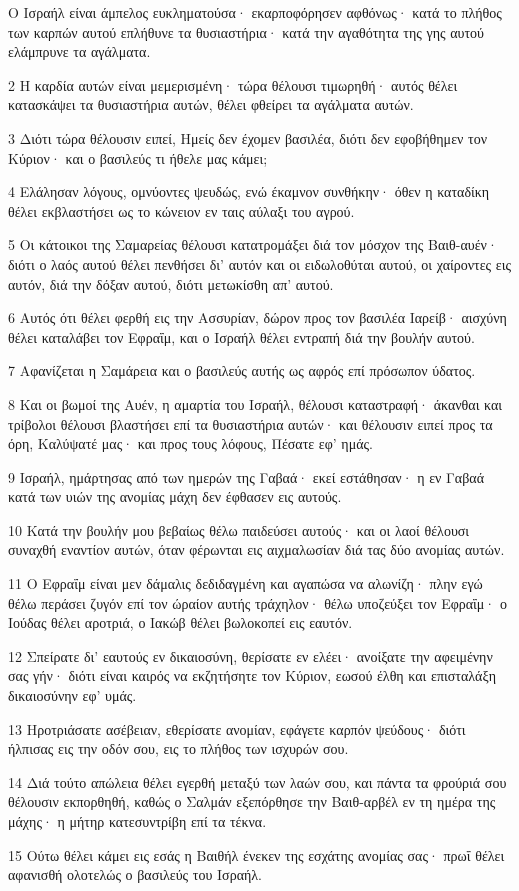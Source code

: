 \par Ο Ισραήλ είναι άμπελος ευκληματούσα· εκαρποφόρησεν αφθόνως· κατά το πλήθος των καρπών αυτού επλήθυνε τα θυσιαστήρια· κατά την αγαθότητα της γης αυτού ελάμπρυνε τα αγάλματα.
\par 2 Η καρδία αυτών είναι μεμερισμένη· τώρα θέλουσι τιμωρηθή· αυτός θέλει κατασκάψει τα θυσιαστήρια αυτών, θέλει φθείρει τα αγάλματα αυτών.
\par 3 Διότι τώρα θέλουσιν ειπεί, Ημείς δεν έχομεν βασιλέα, διότι δεν εφοβήθημεν τον Κύριον· και ο βασιλεύς τι ήθελε μας κάμει;
\par 4 Ελάλησαν λόγους, ομνύοντες ψευδώς, ενώ έκαμνον συνθήκην· όθεν η καταδίκη θέλει εκβλαστήσει ως το κώνειον εν ταις αύλαξι του αγρού.
\par 5 Οι κάτοικοι της Σαμαρείας θέλουσι κατατρομάξει διά τον μόσχον της Βαιθ-αυέν· διότι ο λαός αυτού θέλει πενθήσει δι' αυτόν και οι ειδωλοθύται αυτού, οι χαίροντες εις αυτόν, διά την δόξαν αυτού, διότι μετωκίσθη απ' αυτού.
\par 6 Αυτός ότι θέλει φερθή εις την Ασσυρίαν, δώρον προς τον βασιλέα Ιαρείβ· αισχύνη θέλει καταλάβει τον Εφραΐμ, και ο Ισραήλ θέλει εντραπή διά την βουλήν αυτού.
\par 7 Αφανίζεται η Σαμάρεια και ο βασιλεύς αυτής ως αφρός επί πρόσωπον ύδατος.
\par 8 Και οι βωμοί της Αυέν, η αμαρτία του Ισραήλ, θέλουσι καταστραφή· άκανθαι και τρίβολοι θέλουσι βλαστήσει επί τα θυσιαστήρια αυτών· και θέλουσιν ειπεί προς τα όρη, Καλύψατέ μας· και προς τους λόφους, Πέσατε εφ' ημάς.
\par 9 Ισραήλ, ημάρτησας από των ημερών της Γαβαά· εκεί εστάθησαν· η εν Γαβαά κατά των υιών της ανομίας μάχη δεν έφθασεν εις αυτούς.
\par 10 Κατά την βουλήν μου βεβαίως θέλω παιδεύσει αυτούς· και οι λαοί θέλουσι συναχθή εναντίον αυτών, όταν φέρωνται εις αιχμαλωσίαν διά τας δύο ανομίας αυτών.
\par 11 Ο Εφραΐμ είναι μεν δάμαλις δεδιδαγμένη και αγαπώσα να αλωνίζη· πλην εγώ θέλω περάσει ζυγόν επί τον ώραίον αυτής τράχηλον· θέλω υποζεύξει τον Εφραΐμ· ο Ιούδας θέλει αροτριά, ο Ιακώβ θέλει βωλοκοπεί εις εαυτόν.
\par 12 Σπείρατε δι' εαυτούς εν δικαιοσύνη, θερίσατε εν ελέει· ανοίξατε την αφειμένην σας γήν· διότι είναι καιρός να εκζητήσητε τον Κύριον, εωσού έλθη και επισταλάξη δικαιοσύνην εφ' υμάς.
\par 13 Ηροτριάσατε ασέβειαν, εθερίσατε ανομίαν, εφάγετε καρπόν ψεύδους· διότι ήλπισας εις την οδόν σου, εις το πλήθος των ισχυρών σου.
\par 14 Διά τούτο απώλεια θέλει εγερθή μεταξύ των λαών σου, και πάντα τα φρούριά σου θέλουσιν εκπορθηθή, καθώς ο Σαλμάν εξεπόρθησε την Βαιθ-αρβέλ εν τη ημέρα της μάχης· η μήτηρ κατεσυντρίβη επί τα τέκνα.
\par 15 Ούτω θέλει κάμει εις εσάς η Βαιθήλ ένεκεν της εσχάτης ανομίας σας· πρωΐ θέλει αφανισθή ολοτελώς ο βασιλεύς του Ισραήλ.

